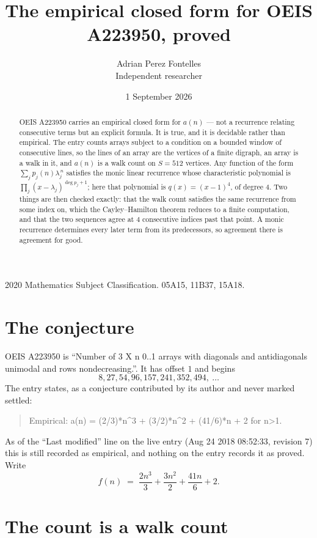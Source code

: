 \documentclass[11pt,a4paper]{article}
\title{The empirical closed form for OEIS A223950, proved}
\author{Adrian Perez Fontelles\\ \small Independent researcher}
\date{1 September 2026}
\theoremstyle{plain}
\theoremstyle{definition}
\begin{document}
\maketitle

\begin{abstract}
OEIS A223950 carries an empirical closed form for $a(n)$ --- not a recurrence relating
consecutive terms but an explicit formula. It is true, and it is decidable rather than
empirical. The entry counts arrays subject to a condition on a bounded window of consecutive lines, so the lines of an array are the
vertices of a finite digraph, an array is a walk in it, and $a(n)$ is a walk count on
$S=512$ vertices. Any function of the form $\sum_j p_j(n)\lambda_j^{\,n}$ satisfies the
monic linear recurrence whose characteristic polynomial is
$\prod_j(x-\lambda_j)^{\deg p_j+1}$; here that polynomial is $q(x)=(x-1)^{4}$, of degree
$4$. Two things are then checked exactly: that the walk count satisfies the same
recurrence from some index on, which the Cayley--Hamilton theorem reduces to a finite
computation, and that the two sequences agree at $4$ consecutive indices past that
point. A monic recurrence determines every later term from its predecessors, so agreement
there is agreement for good.
\end{abstract}

\noindent\small 2020 Mathematics Subject Classification. 05A15, 11B37, 15A18.\normalsize

\section{The conjecture}

OEIS A223950 is ``Number of 3 X n 0..1 arrays with diagonals and antidiagonals unimodal and rows nondecreasing.''. It has offset $1$ and begins
\[
8, 27, 54, 96, 157, 241, 352, 494,\ \dots
\]
The entry states, as a conjecture contributed by its author and never marked settled:
\begin{quote}
Empirical: a(n) = (2/3)*n\^{}3 + (3/2)*n\^{}2 + (41/6)*n + 2 for n>1.
\end{quote}
As of the ``Last modified'' line on the live entry (Aug 24 2018 08:52:33, revision 7) this is still
recorded as empirical, and nothing on the entry records it as proved. Write
\[
f(n)\;=\;\frac{2 n^{3}}{3} + \frac{3 n^{2}}{2} + \frac{41 n}{6} + 2.
\]

\section{The count is a walk count}
\end{document}
